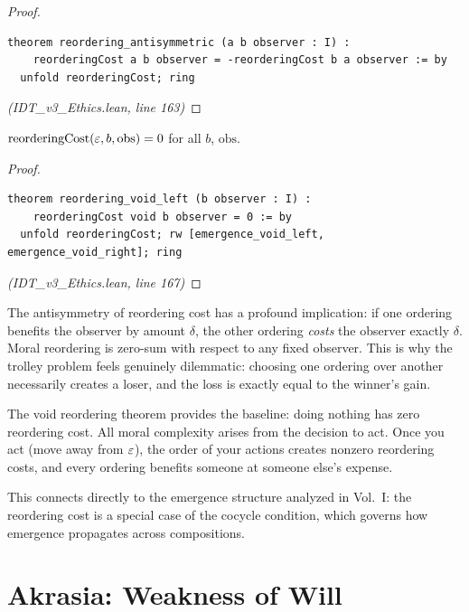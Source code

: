 \begin{proof}
\begin{lstlisting}
theorem reordering_antisymmetric (a b observer : I) :
    reorderingCost a b observer = -reorderingCost b a observer := by
  unfold reorderingCost; ring
\end{lstlisting}
\textit{(IDT\_v3\_Ethics.lean, line 163)}
\end{proof}

\begin{theorem}
\label{thm:reordering-void}
$\mathrm{reorderingCost}(\varepsilon, b, \mathrm{obs}) = 0$ for all $b$, $\mathrm{obs}$.
\end{theorem}

\begin{proof}
\begin{lstlisting}
theorem reordering_void_left (b observer : I) :
    reorderingCost void b observer = 0 := by
  unfold reorderingCost; rw [emergence_void_left, emergence_void_right]; ring
\end{lstlisting}
\textit{(IDT\_v3\_Ethics.lean, line 167)}
\end{proof}

\begin{interpretation}
The antisymmetry of reordering cost has a profound implication: if one ordering
benefits the observer by amount $\delta$, the other ordering \emph{costs}
the observer exactly $\delta$. Moral reordering is zero-sum with respect to
any fixed observer. This is why the trolley problem feels genuinely dilemmatic:
choosing one ordering over another necessarily creates a loser, and the loss
is exactly equal to the winner's gain.

The void reordering theorem provides the baseline: doing nothing has zero
reordering cost. All moral complexity arises from the decision to act. Once
you act (move away from $\varepsilon$), the order of your actions creates nonzero
reordering costs, and every ordering benefits someone at someone else's expense.

This connects directly to the emergence structure analyzed in Vol.~I:
the reordering cost is a special case of the cocycle condition, which
governs how emergence propagates across compositions.
\end{interpretation}

\section{Akrasia: Weakness of Will}
\label{sec:akrasia}

